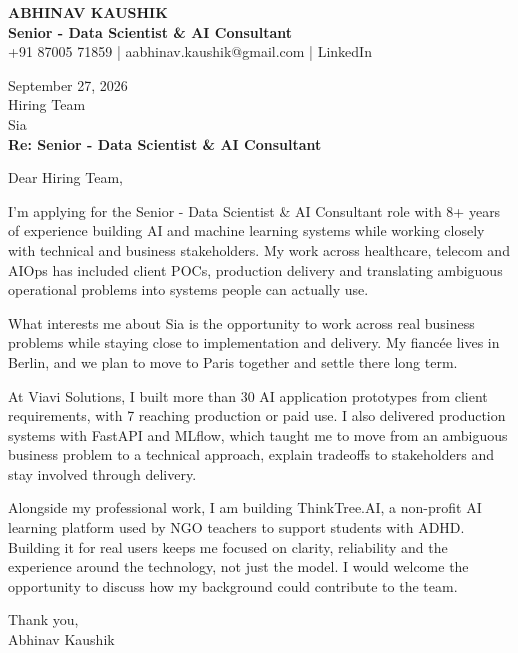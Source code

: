 \documentclass[10pt,a4paper]{article}
\begin{document}
\begin{center}
{\Large\bfseries ABHINAV KAUSHIK}\\[2pt]
{\bfseries Senior - Data Scientist \& AI Consultant}\\[2pt]
+91 87005 71859 \quad | \quad aabhinav.kaushik@gmail.com \quad | \quad LinkedIn
\end{center}
\vspace{8pt}
September 27, 2026\\[6pt]
Hiring Team\\
Sia\\[4pt]
\textbf{Re: Senior - Data Scientist \& AI Consultant}

Dear Hiring Team,

I’m applying for the Senior - Data Scientist \& AI Consultant role with 8+ years of experience building AI and machine learning systems while working closely with technical and business stakeholders. My work across healthcare, telecom and AIOps has included client POCs, production delivery and translating ambiguous operational problems into systems people can actually use.

What interests me about Sia is the opportunity to work across real business problems while staying close to implementation and delivery. My fiancée lives in Berlin, and we plan to move to Paris together and settle there long term.

At Viavi Solutions, I built more than 30 AI application prototypes from client requirements, with 7 reaching production or paid use. I also delivered production systems with FastAPI and MLflow, which taught me to move from an ambiguous business problem to a technical approach, explain tradeoffs to stakeholders and stay involved through delivery.

Alongside my professional work, I am building ThinkTree.AI, a non-profit AI learning platform used by NGO teachers to support students with ADHD. Building it for real users keeps me focused on clarity, reliability and the experience around the technology, not just the model. I would welcome the opportunity to discuss how my background could contribute to the team.

Thank you,\\
Abhinav Kaushik
\end{document}
